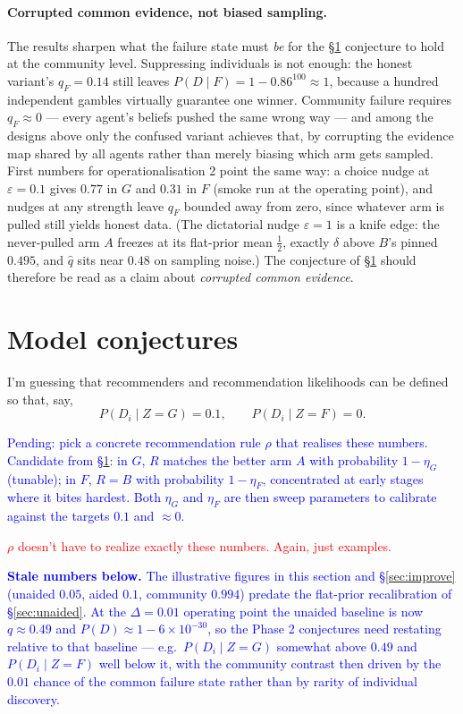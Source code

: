 \documentclass[12pt]{article}
\newcommand{\ignacio}[1]{\textcolor{blue}{#1}}
\newcommand{\michael}[1]{\textcolor{red}{#1}}
\begin{document}
\paragraph{Corrupted common evidence, not biased sampling.}
The results sharpen what the failure state must \emph{be} for the \S\ref{sec:conj} conjecture to hold at the community level. Suppressing individuals is not enough: the honest variant's $q_F = 0.14$ still leaves $P(D \mid F) = 1 - 0.86^{100} \approx 1$, because a hundred independent gambles virtually guarantee one winner. Community failure requires $q_F \approx 0$ --- every agent's beliefs pushed the same wrong way --- and among the designs above only the confused variant achieves that, by corrupting the evidence map shared by all agents rather than merely biasing which arm gets sampled. First numbers for operationalisation 2 point the same way: a choice nudge at $\varepsilon = 0.1$ gives $0.77$ in $G$ and $0.31$ in $F$ (smoke run at the operating point), and nudges at any strength leave $q_F$ bounded away from zero, since whatever arm is pulled still yields honest data. (The dictatorial nudge $\varepsilon = 1$ is a knife edge: the never-pulled arm $A$ freezes at its flat-prior mean $\tfrac12$, exactly $\delta$ above $B$'s pinned $0.495$, and $\hat q$ sits near $0.48$ on sampling noise.) The conjecture of \S\ref{sec:conj} should therefore be read as a claim about \emph{corrupted common evidence}.

\section{Model conjectures}
\label{sec:conj}

I'm guessing that recommenders and recommendation likelihoods can be defined so that, say,
\[
  P(D_i \mid Z = G) = 0.1, \qquad P(D_i \mid Z = F) = 0.
\]

\ignacio{Pending: pick a concrete recommendation rule $\rho$ that realises these numbers. Candidate from \S\ref{sec:conj}: in $G$, $R$ matches the better arm $A$ with probability $1 - \eta_G$ (tunable); in $F$, $R = B$ with probability $1 - \eta_F$, concentrated at early stages where it bites hardest. Both $\eta_G$ and $\eta_F$ are then sweep parameters to calibrate against the targets $0.1$ and $\approx 0$.}

\michael{$\rho$ doesn't have to realize exactly these numbers. Again, just examples. }

\ignacio{\textbf{Stale numbers below.} The illustrative figures in this section and \S\ref{sec:improve} (unaided $0.05$, aided $0.1$, community $0.994$) predate the flat-prior recalibration of \S\ref{sec:unaided}. At the $\Delta = 0.01$ operating point the unaided baseline is now $q \approx 0.49$ and $P(D) \approx 1 - 6\times10^{-30}$, so the Phase 2 conjectures need restating relative to that baseline --- e.g.\ $P(D_i \mid Z = G)$ somewhat above $0.49$ and $P(D_i \mid Z = F)$ well below it, with the community contrast then driven by the $0.01$ chance of the common failure state rather than by rarity of individual discovery.}
\end{document}
